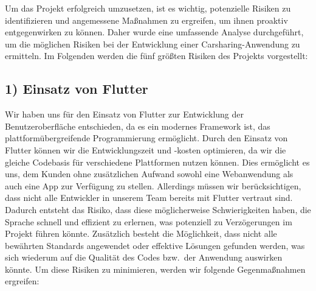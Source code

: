 Um das Projekt erfolgreich umzusetzen, ist es wichtig, potenzielle Risiken zu identifizieren und angemessene Maßnahmen zu ergreifen, um ihnen proaktiv entgegenwirken zu können.
Daher wurde eine umfassende Analyse durchgeführt, um die möglichen Risiken bei der Entwicklung einer Carsharing-Anwendung zu ermitteln.
Im Folgenden werden die fünf größten Risiken des Projekts vorgestellt:

\subsection*{1) Einsatz von Flutter}
Wir haben uns für den Einsatz von Flutter zur Entwicklung der Benutzeroberfläche entschieden, da es ein modernes Framework ist, das plattformübergreifende Programmierung ermöglicht.
Durch den Einsatz von Flutter können wir die Entwicklungszeit und -kosten optimieren, da wir die gleiche Codebasis für verschiedene Plattformen nutzen können.
Dies ermöglicht es uns, dem Kunden ohne zusätzlichen Aufwand sowohl eine Webanwendung als auch eine App zur Verfügung zu stellen.
Allerdings müssen wir berücksichtigen, dass nicht alle Entwickler in unserem Team bereits mit Flutter vertraut sind.
Dadurch entsteht das Risiko, dass diese möglicherweise Schwierigkeiten haben, die Sprache schnell und effizient zu erlernen, was potenziell zu Verzögerungen im Projekt führen könnte.
Zusätzlich besteht die Möglichkeit, dass nicht alle bewährten Standards angewendet oder effektive Lösungen gefunden werden, was sich wiederum auf die Qualität des Codes bzw.\ der Anwendung auswirken könnte.
Um diese Risiken zu minimieren, werden wir folgende Gegenmaßnahmen ergreifen:
